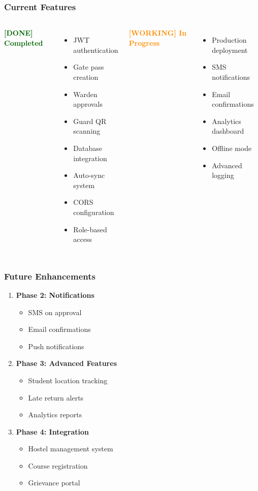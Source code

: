 \documentclass[11pt]{beamer}
\begin{document}
\begin{frame}
\frametitle{Current Features}
\begin{columns}[T]
\textbf{\textcolor{darkgreen}{[DONE] Completed}}
\begin{itemize}
    \item JWT authentication
    \item Gate pass creation
    \item Warden approvals
    \item Guard QR scanning
    \item Database integration
    \item Auto-sync system
    \item CORS configuration
    \item Role-based access
\end{itemize}

\textbf{\textcolor{darkorange}{[WORKING] In Progress}}
\begin{itemize}
    \item Production deployment
    \item SMS notifications
    \item Email confirmations
    \item Analytics dashboard
    \item Offline mode
    \item Advanced logging
\end{itemize}
\end{columns}
\end{frame}

\begin{frame}
\frametitle{Future Enhancements}
\begin{enumerate}
    \item \textbf{Phase 2: Notifications}
    \begin{itemize}
        \item SMS on approval
        \item Email confirmations
        \item Push notifications
    \end{itemize}
    
    \item \textbf{Phase 3: Advanced Features}
    \begin{itemize}
        \item Student location tracking
        \item Late return alerts
        \item Analytics reports
    \end{itemize}
    
    \item \textbf{Phase 4: Integration}
    \begin{itemize}
        \item Hostel management system
        \item Course registration
        \item Grievance portal
    \end{itemize}
\end{enumerate}
\end{frame}
\end{document}
